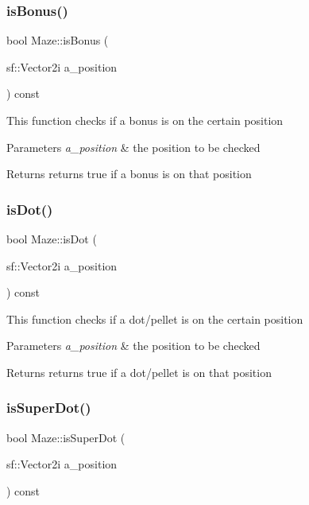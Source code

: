 \subsubsection{\texorpdfstring{is\+Bonus()}{isBonus()}}
{\footnotesize\ttfamily bool Maze\+::is\+Bonus (\begin{DoxyParamCaption}\item[{sf\+::\+Vector2i}]{a\+\_\+position }\end{DoxyParamCaption}) const}

This function checks if a bonus is on the certain position


\begin{DoxyParams}{Parameters}
{\em a\+\_\+position} & the position to be checked \\
\hline
\end{DoxyParams}
\begin{DoxyReturn}{Returns}
returns true if a bonus is on that position 
\end{DoxyReturn}
\mbox{\label{class_maze_a26a1d805927e965b54ffa261a87600b9}} 
\subsubsection{\texorpdfstring{is\+Dot()}{isDot()}}
{\footnotesize\ttfamily bool Maze\+::is\+Dot (\begin{DoxyParamCaption}\item[{sf\+::\+Vector2i}]{a\+\_\+position }\end{DoxyParamCaption}) const}

This function checks if a dot/pellet is on the certain position


\begin{DoxyParams}{Parameters}
{\em a\+\_\+position} & the position to be checked \\
\hline
\end{DoxyParams}
\begin{DoxyReturn}{Returns}
returns true if a dot/pellet is on that position 
\end{DoxyReturn}
\mbox{\label{class_maze_a52450a5ef93f1d11802969587b5ee00d}} 
\subsubsection{\texorpdfstring{is\+Super\+Dot()}{isSuperDot()}}
{\footnotesize\ttfamily bool Maze\+::is\+Super\+Dot (\begin{DoxyParamCaption}\item[{sf\+::\+Vector2i}]{a\+\_\+position }\end{DoxyParamCaption}) const}

